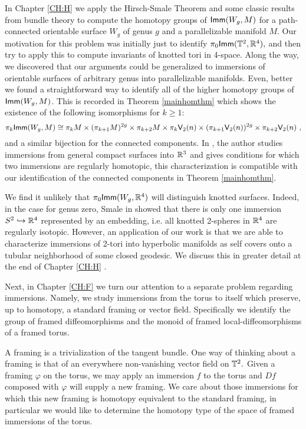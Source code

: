 In Chapter \ref{CH:H} we apply the Hirsch-Smale Theorem and some classic results from bundle theory to compute the homotopy groups of ${\sf Imm}(W_{g}, M)$ for a path-connected orientable surface $W_{g}$ of genus $g$ and a parallelizable manifold $M$. Our motivation for this problem was initially just to identify $\pi_{0}{\sf Imm}(\mathbb T^{2}, \mathbb R^{4}),$ and then try to apply this to compute invariants of knotted tori in 4-space. Along the way, we discovered that our arguments could be generalized to immersions of orientable surfaces of arbitrary genus into parallelizable manifolds. Even, better we found a straightforward way to identify all of the higher homotopy groups of ${\sf Imm}(W_{g}, M)$. This is recorded in Theorem \ref{mainhomthm} which shows the existence of the following isomorphisms for $k \geq 1$: 
\[
\pi_{k}{\sf Imm}(W_{g}, M) \cong \pi_{k}M \times (\pi_{k + 1}M)^{2g} \times \pi_{k + 2}M \times \pi_{k}\mathsf V_{2}(n) \times (\pi_{k + 1}\mathsf V_{2}(n))^{2g} \times \pi_{k + 2}\mathsf V_{2}(n) ~,
\]
and a similar bijection for the connected components. In \cite{Pink}, the author studies immersions from general compact surfaces into $\mathbb R^{3}$ and gives conditions for which two immersions are regularly homotopic, this characterization is compatible with our identification of the connected components in Theorem \ref{mainhomthm}.



We find it unlikely that $\pi_{0}{\sf Imm}(W_{g}, \mathbb R^{4})$ will distinguish knotted surfaces. Indeed, in the case for genus zero, Smale in \cite{Sm3} showed that there is only one immersion $S^{2} \hookrightarrow \mathbb R^{4}$ represented by an embedding, i.e. all knotted 2-spheres in $\mathbb R^{4}$ are regularly isotopic. However, an application of our work is that we are able to characterize immersions of 2-tori into hyperbolic manifolds as self covers onto a tubular neighborhood of some closed geodesic. We discuss this in greater detail at the end of Chapter \ref{CH:H} .



Next, in Chapter \ref{CH:F} we turn our attention to a separate problem regarding immersions. Namely, we study immersions from the torus to itself which preserve, up to homotopy, a standard framing or vector field. Specifically we identify the group of framed diffeomorphisms and the monoid of framed local-diffeomorphisms of a framed torus. 

A framing is a trivialization of the tangent bundle. One way of thinking about a framing is that of an everywhere non-vanishing vector field on $\mathbb T^{2}.$ Given a framing $\varphi$ on the torus, we may apply an immersion $f$ to the torus and $Df$ composed with $\varphi$ will supply a new framing. We care about those immersions for which this new framing is homotopy equivalent to the standard framing, in particular we would like to determine the homotopy type of the space of framed immersions of the torus.

